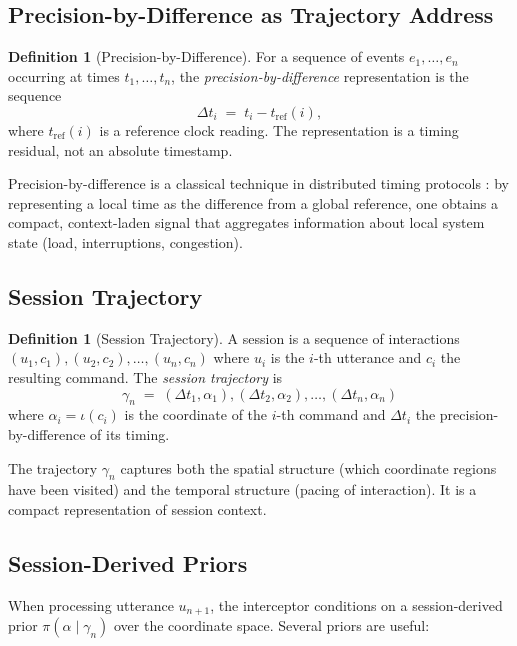 \documentclass[11pt,a4paper]{article}
\theoremstyle{definition}
\newtheorem{definition}[theorem]{Definition}
\theoremstyle{remark}
\begin{document}
\subsection{Precision-by-Difference as Trajectory Address}

\begin{definition}[Precision-by-Difference]
\label{def:pbd}
For a sequence of events $e_1, \ldots, e_n$ occurring at times $t_1, \ldots, t_n$, the \emph{precision-by-difference} representation is the sequence
\[
\Delta t_i \;=\; t_i - t_{\mathrm{ref}}(i),
\]
where $t_{\mathrm{ref}}(i)$ is a reference clock reading. The representation is a timing residual, not an absolute timestamp.
\end{definition}

Precision-by-difference is a classical technique in distributed timing protocols \citep{mills1991ntp}: by representing a local time as the difference from a global reference, one obtains a compact, context-laden signal that aggregates information about local system state (load, interruptions, congestion).

\subsection{Session Trajectory}

\begin{definition}[Session Trajectory]
\label{def:trajectory}
A session is a sequence of interactions $(u_1, c_1), (u_2, c_2), \ldots, (u_n, c_n)$ where $u_i$ is the $i$-th utterance and $c_i$ the resulting command. The \emph{session trajectory} is
\[
\gamma_n \;=\; (\Delta t_1, \alpha_1), (\Delta t_2, \alpha_2), \ldots, (\Delta t_n, \alpha_n)
\]
where $\alpha_i = \iota(c_i)$ is the coordinate of the $i$-th command and $\Delta t_i$ the precision-by-difference of its timing.
\end{definition}

The trajectory $\gamma_n$ captures both the spatial structure (which coordinate regions have been visited) and the temporal structure (pacing of interaction). It is a compact representation of session context.

\subsection{Session-Derived Priors}

When processing utterance $u_{n+1}$, the interceptor conditions on a session-derived prior $\pi(\alpha \mid \gamma_n)$ over the coordinate space. Several priors are useful:
\end{document}
